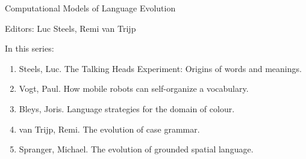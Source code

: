 {\large Computational Models of Language Evolution}

\bigskip

Editors: Luc Steels, Remi van Trijp

\bigskip

In this series:

\begin{enumerate}
\item Steels, Luc. The Talking Heads Experiment: Origins of words and meanings.
\item Vogt, Paul. How mobile robots can self-organize a vocabulary.
\item Bleys, Joris. Language strategies for the domain of colour.
\item van Trijp, Remi. The evolution of case grammar.
\item Spranger, Michael. The evolution of grounded spatial language.
\end{enumerate}
